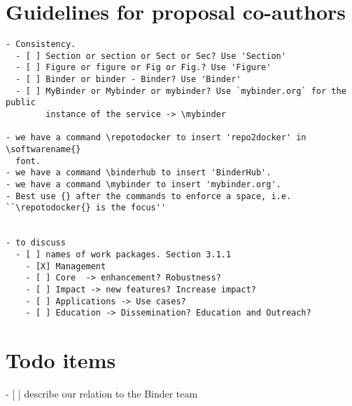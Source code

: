 \documentclass[
  deliverables,
  longtasklabels,
  numericcites,
  noworkareas,
  svgnames,
  \classoptions
]{euproposal}       %
\newcommand{\softwarename}[1]{\texttt{#1}}
\newcommand{\repotodocker}{\softwarename{repo2docker}}
\newcommand{\binderhub}{\softwarename{BinderHub}}
\newcommand{\mybinder}{mybinder.org}   %
\begin{document}
\begin{draft}


\section*{Guidelines for proposal co-authors}

\begin{verbatim}
- Consistency.
  - [ ] Section or section or Sect or Sec? Use 'Section'
  - [ ] Figure or figure or Fig or Fig.? Use 'Figure'
  - [ ] Binder or binder - Binder? Use 'Binder'
  - [ ] MyBinder or Mybinder or mybinder? Use `mybinder.org` for the public
        instance of the service -> \mybinder

- we have a command \repotodocker to insert 'repo2docker' in \softwarename{}
  font.
- we have a command \binderhub to insert 'BinderHub'.
- we have a command \mybinder to insert 'mybinder.org'.
- Best use {} after the commands to enforce a space, i.e. ``\repotodocker{} is the focus''


- to discuss
  - [ ] names of work packages. Section 3.1.1
    - [X] Management
    - [ ] Core  -> enhancement? Robustness? 
    - [ ] Impact -> new features? Increase impact?
    - [ ] Applications -> Use cases?
    - [ ] Education -> Dissemination? Education and Outreach?
\end{verbatim}

\section*{Todo items}
- [ ] describe our relation to the Binder team

\end{draft}
\clearpage
\end{document}
